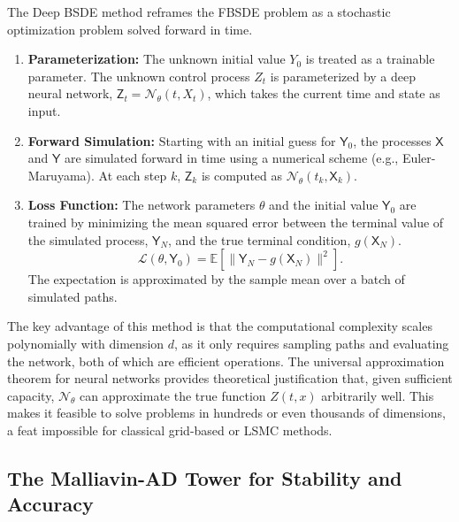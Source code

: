 \begin{definition}
The Deep BSDE method \cite{EHanJentzen2017} reframes the FBSDE problem as a stochastic optimization problem solved forward in time.
\begin{enumerate}
    \item \textbf{Parameterization:} The unknown initial value \(Y_0\) is treated as a trainable parameter. The unknown control process \(Z_t\) is parameterized by a deep neural network, \(\mathsf{Z}_t = \mathcal{N}_\theta(t, X_t)\), which takes the current time and state as input.
    \item \textbf{Forward Simulation:} Starting with an initial guess for \(\mathsf{Y}_0\), the processes \(\mathsf{X}\) and \(\mathsf{Y}\) are simulated forward in time using a numerical scheme (e.g., Euler-Maruyama). At each step \(k\), \(\mathsf{Z}_k\) is computed as \(\mathcal{N}_\theta(t_k, \mathsf{X}_k)\).
    \item \textbf{Loss Function:} The network parameters \(\theta\) and the initial value \(\mathsf{Y}_0\) are trained by minimizing the mean squared error between the terminal value of the simulated process, \(\mathsf{Y}_N\), and the true terminal condition, \(g(\mathsf{X}_N)\).
    \[
      \mathcal{L}(\theta, \mathsf{Y}_0) = \mathbb{E}\left[ \| \mathsf{Y}_N - g(\mathsf{X}_N) \|^2 \right].
    \]
    The expectation is approximated by the sample mean over a batch of simulated paths.
\end{enumerate}
\end{definition}

\begin{remark}
The key advantage of this method is that the computational complexity scales polynomially with dimension \(d\), as it only requires sampling paths and evaluating the network, both of which are efficient operations. The universal approximation theorem for neural networks provides theoretical justification that, given sufficient capacity, \(\mathcal{N}_\theta\) can approximate the true function \(Z(t,x)\) arbitrarily well. This makes it feasible to solve problems in hundreds or even thousands of dimensions, a feat impossible for classical grid-based or LSMC methods.
\end{remark}

\subsection{The Malliavin-AD Tower for Stability and Accuracy}
\label{sec:malliavin_tower_rigorous}

